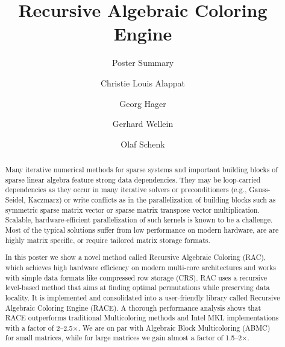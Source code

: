 \documentclass[sigplan, review]{acmart}
\begin{document}
\title[RACE]{Recursive Algebraic Coloring Engine}
\subtitle{Poster Summary}

\author{Christie Louis Alappat}

\author{Georg Hager}

\author{Gerhard Wellein}

\author{Olaf Schenk}

\renewcommand{\shortauthors}{C. Alappat et al.}



\begin{abstract}
Many iterative numerical methods for sparse systems and important building blocks of sparse linear algebra feature strong data dependencies. They may be loop-carried dependencies as they occur in many iterative solvers or preconditioners (e.g., Gauss-Seidel, Kaczmarz) or write conflicts as in the parallelization of building blocks such as symmetric sparse matrix vector or sparse matrix transpose vector multiplication. Scalable, hardware-efficient parallelization of such kernels is known to be a challenge. Most of the typical solutions suffer from low performance on modern hardware, are are highly matrix specific, or require tailored matrix storage formats.

In this poster we show a novel method called Recursive Algebraic Coloring (RAC), which achieves high hardware efficiency on modern multi-core architectures and works with simple data formats like compressed row storage (CRS). RAC uses a recursive level-based method that aims at finding optimal permutations while preserving data locality. It is implemented and consolidated into a user-friendly library called Recursive Algebraic Coloring Engine (RACE). A thorough performance analysis shows that RACE outperforms traditional Multicoloring methods and Intel MKL implementations with a factor of 2--2.5$\times$. We are on par with Algebraic Block Multicoloring (ABMC) for small matrices, while for large matrices we gain almost a factor of 1.5--2$\times$.
\end{abstract}
\end{document}
